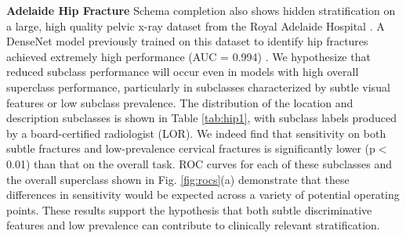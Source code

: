 \documentclass[sigconf]{acmart}
\begin{document}
\textbf{Adelaide Hip Fracture} Schema completion also shows hidden stratification on a large, high quality pelvic x-ray dataset from the Royal Adelaide Hospital \citep{Gale_W_Oakden-Rayner_L_Carneiro_G_Bradley_AP_Palmer_LJ2017-tl}.
 A DenseNet model previously trained on this dataset to identify hip fractures achieved extremely high performance (AUC = 0.994) \citep{Gale_W_Oakden-Rayner_L_Carneiro_G_Bradley_AP_Palmer_LJ2017-tl}. 
  We hypothesize that reduced subclass performance will occur even in models with high overall superclass performance, particularly in subclasses characterized by subtle visual features or low subclass prevalence.  
 The distribution of the location and description subclasses is shown in Table \ref{tab:hip1}, with subclass labels produced by a board-certified radiologist (LOR).  
 We indeed find that sensitivity on both subtle fractures and low-prevalence cervical fractures is significantly lower (p$<$0.01) than that on the overall task. 
ROC curves for each of these subclasses and the overall superclass shown in Fig. \ref{fig:rocs}(a) demonstrate that these differences in sensitivity would be expected across a variety of potential operating points. 
These results support the hypothesis that both subtle discriminative features and low prevalence can contribute to clinically relevant stratification. 

 
\end{document}
